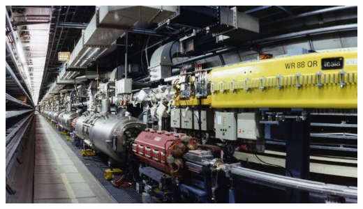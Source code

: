 \documentclass[10pt,t]{beamer}
\begin{document}
\begin{frame}
\begin{columns}[c]
    \includegraphics[width=\textwidth,trim={0 0 0 0},clip]{beschleuniger-tunnel}
\end{columns}
\end{frame}
\end{document}
